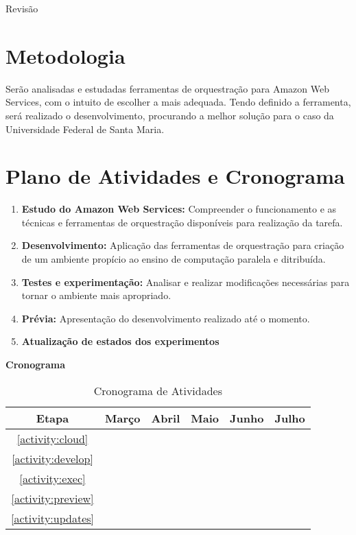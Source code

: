 \documentclass[12pt]{article}
\begin{document}
Revisão

\section{Metodologia}
Serão analisadas e estudadas ferramentas de orquestração para Amazon Web Services, com o intuito de escolher a mais adequada. Tendo definido a ferramenta, será realizado o desenvolvimento, procurando a melhor solução para o caso da Universidade Federal de Santa Maria.

\section{Plano de Atividades e Cronograma}
\begin{enumerate}
\item \label{activity:cloud} \textbf{Estudo do Amazon Web Services: }
Compreender o funcionamento e as técnicas e ferramentas de orquestração disponíveis para realização da tarefa.
\item \label{activity:develop} \textbf{Desenvolvimento: }
Aplicação das ferramentas de orquestração para criação de um ambiente propício ao ensino de computação paralela e ditribuída.
\item \label{activity:exec} \textbf{Testes e experimentação: }
Analisar e realizar modificações necessárias para tornar o ambiente mais apropriado.
\item \label{activity:preview} \textbf{Prévia: }
Apresentação do desenvolvimento realizado até o momento.
\item  \label{activity:updates} \textbf{Atualização de estados dos experimentos}

\end{enumerate}
\textbf{Cronograma}

\begin{table}[ht]
\centering
\begin{tabular}{c|ccccc}
	Etapa & Março & Abril & Maio & Junho & Julho \\ \hline
	\ref{activity:cloud} & \checkmark & & & \\
	\ref{activity:develop} & \checkmark & \checkmark & & \\
	\ref{activity:exec} & & \checkmark & \checkmark & \checkmark & \\
	\ref{activity:preview} & & & \checkmark & & \\
	\ref{activity:updates} & & &\checkmark & \checkmark & \checkmark \\
\end{tabular}
\caption{Cronograma de Atividades}

\end{table}
\end{document}
